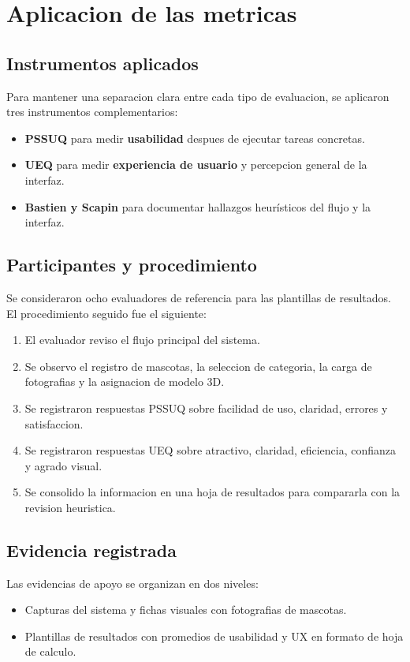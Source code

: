 \documentclass[12pt,a4paper]{article}
\begin{document}
\section{Aplicacion de las metricas}
\subsection{Instrumentos aplicados}
Para mantener una separacion clara entre cada tipo de evaluacion, se aplicaron tres instrumentos complementarios:
\begin{itemize}[leftmargin=*]
  \item \textbf{PSSUQ} para medir \textbf{usabilidad} despues de ejecutar tareas concretas.
  \item \textbf{UEQ} para medir \textbf{experiencia de usuario} y percepcion general de la interfaz.
  \item \textbf{Bastien y Scapin} para documentar hallazgos heur\'isticos del flujo y la interfaz.
\end{itemize}

\subsection{Participantes y procedimiento}
Se consideraron ocho evaluadores de referencia para las plantillas de resultados. El procedimiento seguido fue el siguiente:
\begin{enumerate}[leftmargin=*]
  \item El evaluador reviso el flujo principal del sistema.
  \item Se observo el registro de mascotas, la seleccion de categoria, la carga de fotografias y la asignacion de modelo 3D.
  \item Se registraron respuestas PSSUQ sobre facilidad de uso, claridad, errores y satisfaccion.
  \item Se registraron respuestas UEQ sobre atractivo, claridad, eficiencia, confianza y agrado visual.
  \item Se consolido la informacion en una hoja de resultados para compararla con la revision heuristica.
\end{enumerate}

\subsection{Evidencia registrada}
Las evidencias de apoyo se organizan en dos niveles:
\begin{itemize}[leftmargin=*]
  \item Capturas del sistema y fichas visuales con fotografias de mascotas.
  \item Plantillas de resultados con promedios de usabilidad y UX en formato de hoja de calculo.
\end{itemize}
\end{document}
